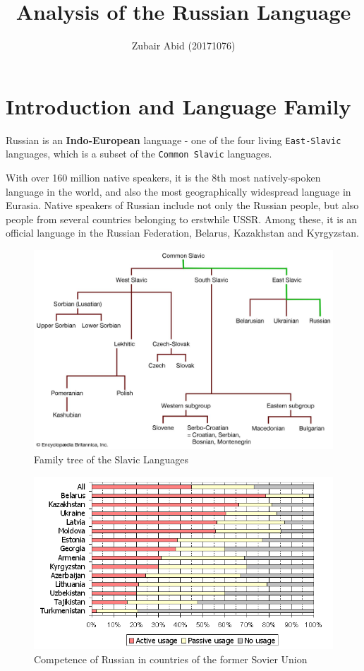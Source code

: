 \documentclass[
  a4paperpaper,
]{report}
\title{Analysis of the Russian Language}
\author{Zubair Abid (20171076)}
\date{}
\begin{document}
\maketitle

{
\setcounter{tocdepth}{2}
\tableofcontents
}
\hypertarget{introduction-and-language-family}{%
\chapter{Introduction and Language
Family}\label{introduction-and-language-family}}

Russian is an \textbf{Indo-European} language - one of the four living
\texttt{East-Slavic} languages, which is a subset of the
\texttt{Common\ Slavic} languages.

With over 160 million native speakers, it is the 8th most
natively-spoken language in the world, and also the most geographically
widespread language in Eurasia. Native speakers of Russian include not
only the Russian people, but also people from several countries
belonging to erstwhile USSR. Among these, it is an official language in
the Russian Federation, Belarus, Kazakhstan and Kyrgyzstan.

\begin{figure}
\centering
\includegraphics{./russtree_russ.jpg}
\caption{Family tree of the Slavic Languages}
\end{figure}

\begin{figure}
\centering
\includegraphics{./russian_usage.PNG}
\caption{Competence of Russian in countries of the former Sovier Union}
\end{figure}
\end{document}
